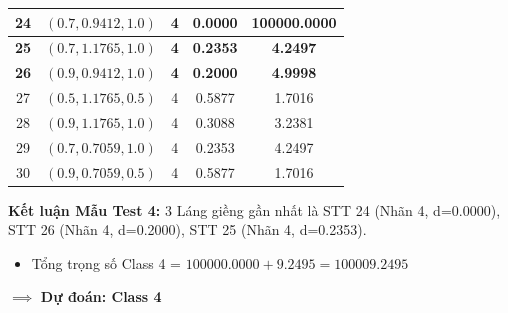 \documentclass[12pt,a4paper]{article}
\begin{document}
\begin{table}[H]
\begin{tabular}{|c|c|c|c|c|}
\textbf{24} & $\mathbf{(0.7, 0.9412, 1.0)}$ & \textbf{4} & \textbf{0.0000} & \textbf{100000.0000} \\ \hline
\textbf{25} & $\mathbf{(0.7, 1.1765, 1.0)}$ & \textbf{4} & \textbf{0.2353} & \textbf{4.2497} \\ \hline
\textbf{26} & $\mathbf{(0.9, 0.9412, 1.0)}$ & \textbf{4} & \textbf{0.2000} & \textbf{4.9998} \\ \hline
27 & $(0.5, 1.1765, 0.5)$ & 4 & 0.5877 & 1.7016 \\ \hline
28 & $(0.9, 1.1765, 1.0)$ & 4 & 0.3088 & 3.2381 \\ \hline
29 & $(0.7, 0.7059, 1.0)$ & 4 & 0.2353 & 4.2497 \\ \hline
30 & $(0.9, 0.7059, 0.5)$ & 4 & 0.5877 & 1.7016 \\ \hline
\end{tabular}
\end{table}

\textbf{Kết luận Mẫu Test 4:} 3 Láng giềng gần nhất là STT 24 (Nhãn 4, d=0.0000), STT 26 (Nhãn 4, d=0.2000), STT 25 (Nhãn 4, d=0.2353).
\begin{itemize}
    \item Tổng trọng số Class 4 = $100000.0000 + 9.2495 = 100009.2495$
\end{itemize}
$\implies$ \textbf{Dự đoán: Class 4}
\end{document}
